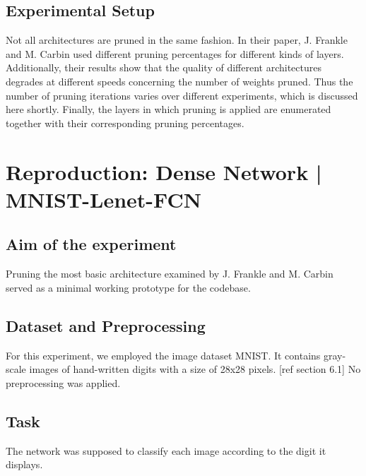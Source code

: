 \subsection*{Experimental Setup}
Not all architectures are pruned in the same fashion. In their paper, J. Frankle and M. Carbin used different pruning percentages for different kinds of layers.\cite{LTH} Additionally, their results show that the quality of different architectures degrades at different speeds concerning the number of weights pruned. Thus the number of pruning iterations varies over different experiments, which is discussed here shortly.
Finally, the layers in which pruning is applied are enumerated together with their corresponding pruning percentages.


\section{Reproduction: Dense Network | MNIST-Lenet-FCN}
\subsection*{Aim of the experiment}
Pruning the most basic architecture examined by J. Frankle and M. Carbin served as a minimal working prototype for the codebase.
\subsection*{Dataset and Preprocessing}
For this experiment, we employed the image dataset MNIST. It contains gray-scale images of hand-written digits with a size of 28x28 pixels. [ref section 6.1]
No preprocessing was applied.
\subsection*{Task}
The network was supposed to classify each image according to the digit it displays.
